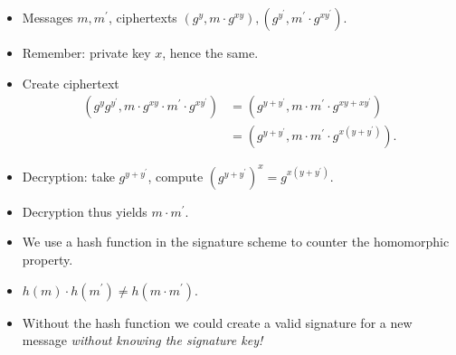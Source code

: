 \begin{frame}
  \begin{example}
    \begin{itemize}
      \item Messages \(m, m^\prime\), ciphertexts \((g^y, m\cdot g^{xy}), 
          (g^{y^\prime}, m^\prime\cdot g^{x y^\prime})\).

      \item Remember: private key \(x\), hence the same.

        \pause{}

      \item Create ciphertext
        \begin{align*}
          (g^y g^{y^\prime}, m\cdot g^{xy}\cdot m^\prime\cdot g^{x y^\prime})
          &= (g^{y + y^\prime}, m\cdot m^\prime\cdot g^{xy + xy^\prime}) \\
          &= (g^{y + y^\prime}, m\cdot m^\prime\cdot g^{x(y + y^\prime)}).
        \end{align*}

        \pause{}

      \item Decryption: take \(g^{y + y^\prime}\), compute \((g^{y+y^\prime})^x 
          = g^{x(y + y^\prime)}\).

      \item Decryption thus yields \(m\cdot m^\prime\).

    \end{itemize}
  \end{example}
\end{frame}

\begin{frame}
  \begin{remark}
    \begin{itemize}
      \item We use a hash function in the signature scheme to counter the 
        homomorphic property.

      \item \(h(m)\cdot h(m^\prime)\neq h(m\cdot m^\prime)\).

        \pause{}

      \item Without the hash function we could create a valid signature for 
        a new message \emph{without knowing the signature key!}
    \end{itemize}
  \end{remark}
\end{frame}

